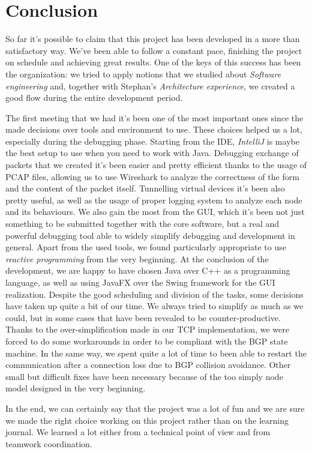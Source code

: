 \chapter{Conclusion}
So far it's possible to claim that this project has been developed in a more than satisfactory way.
We've been able to follow a constant pace, finishing the project on schedule and achieving great results.
One of the keys of this success has been the organization: we tried to apply notions that we studied about \textit{Software engineering} and, together with Stephan's \textit{Architecture experience}, we created a good flow during the entire development period.

The first meeting that we had it's been one of the most important ones since the made decisions over tools and environment to use. These choices helped us a lot, especially during the debugging phase. Starting from the IDE, \textit{IntelliJ} is maybe the best setup to use when you need to work with Java. Debugging exchange of packets that we created it's been easier and pretty efficient thanks to the usage of PCAP files, allowing us to use Wireshark to analyze the correctness of the form and the content of the packet itself.
Tunnelling virtual devices it's been also pretty useful, as well as the usage of proper logging system to analyze each node and its behaviours. We also gain the most from the GUI, which it's been not just something to be submitted together with the core software, but a real and powerful debugging tool able to widely simplify debugging and development in general.
Apart from the used tools, we found particularly appropriate to use \textit{reactive programming} from the very beginning. At the conclusion of the development, we are happy to have chosen Java over C++ as a programming language, as well as using JavaFX over the Swing framework for the GUI realization.
Despite the good scheduling and division of the tasks, some decisions have taken up quite a bit of our time. We always tried to simplify as much as we could, but in some cases that have been revealed to be counter-productive. Thanks to the over-simplification made in our TCP implementation, we were forced to do some workarounds in order to be compliant with the BGP state machine. In the same way, we spent quite a lot of time to been able to restart the communication after a connection loss due to BGP collision avoidance. Other small but difficult fixes have been necessary because of the too simply node model designed in the very beginning.

In the end, we can certainly say that the project was a lot of fun and we are sure we made the right choice working on this project rather than on the learning journal. We learned a lot either from a technical point of view and from teamwork coordination.
